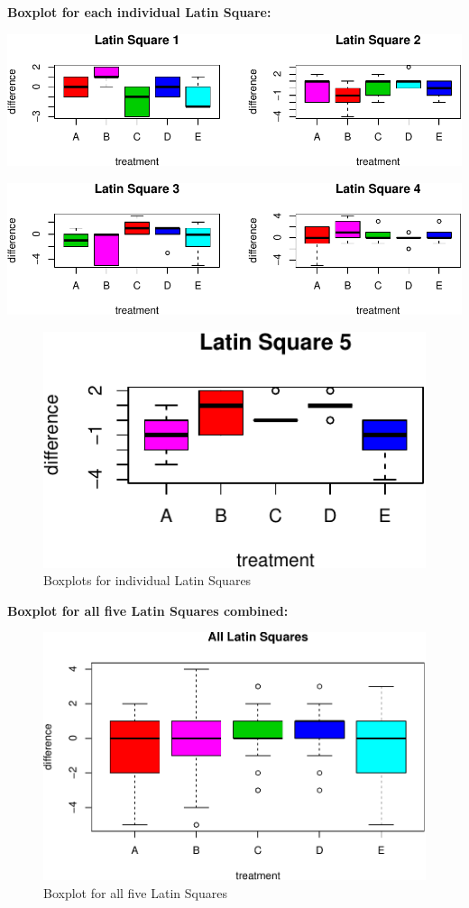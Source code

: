 \documentclass[]{article}
\begin{document}
\textbf{Boxplot for each individual Latin Square:}

\includegraphics{STATS101B-Project_files/figure-latex/unnamed-chunk-4-1.pdf}

\includegraphics{STATS101B-Project_files/figure-latex/unnamed-chunk-5-1.pdf}

\begin{figure}
\centering
\includegraphics{STATS101B-Project_files/figure-latex/unnamed-chunk-6-1.pdf}
\caption{Boxplots for individual Latin Squares}
\end{figure}

\textbf{Boxplot for all five Latin Squares combined:}

\begin{figure}
\centering
\includegraphics{STATS101B-Project_files/figure-latex/unnamed-chunk-7-1.pdf}
\caption{Boxplot for all five Latin Squares}
\end{figure}
\end{document}

